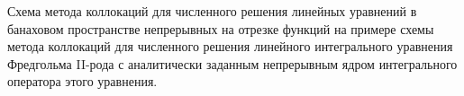 \documentclass[__main__.tex]{subfiles}
\begin{document}
Схема метода коллокаций для численного решения линейных уравнений в банаховом пространстве непрерывных на отрезке функций на примере схемы метода коллокаций для численного решения линейного интегрального уравнения Фредгольма II-рода с аналитически заданным непрерывным ядром интегрального оператора этого уравнения.
\end{document}

